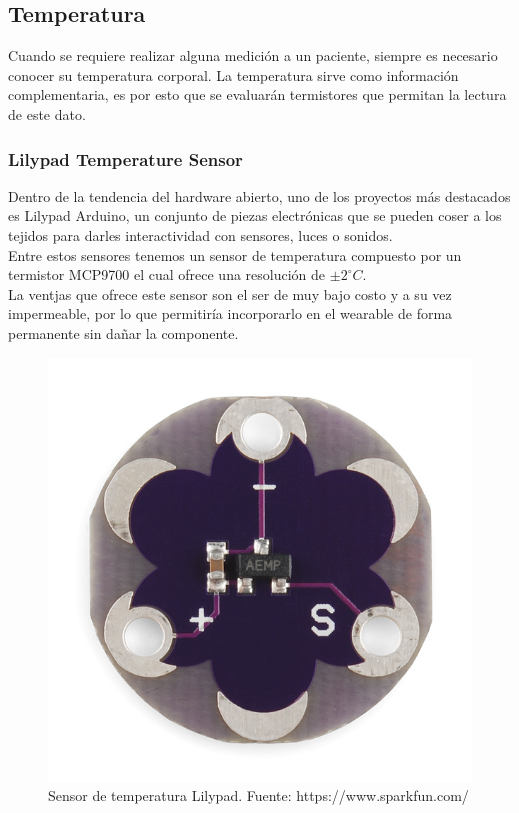 \subsection{Temperatura}
Cuando se requiere realizar alguna medición a un paciente, siempre es necesario conocer su temperatura corporal. La temperatura sirve como información complementaria, es por esto que se evaluarán termistores que permitan la lectura de este dato.
\subsubsection{Lilypad Temperature Sensor}
Dentro de la tendencia del hardware abierto, uno de los proyectos más destacados es Lilypad Arduino, un conjunto de piezas electrónicas que se pueden coser a los tejidos para darles interactividad con sensores, luces o sonidos.\\
Entre estos sensores tenemos un sensor de temperatura compuesto por un termistor MCP9700 el cual ofrece una resolución de $\pm2^\circ C.$\\

\newpage
La ventjas que ofrece este sensor son el ser de muy bajo costo y a su vez impermeable, por lo que permitiría incorporarlo en el wearable de forma permanente sin dañar la componente.

\begin{figure}[H]
	\centering
	\includegraphics[scale=0.7]{figuras/sensor/t/lilypad.jpg}
	\caption{Sensor de temperatura Lilypad. Fuente: https://www.sparkfun.com/}
	\label{Lilypad}
\end{figure}

